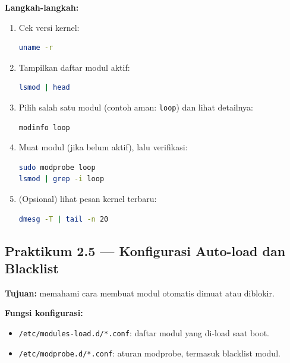 \textbf{Langkah-langkah:}
\begin{enumerate}
    \item Cek versi kernel:
\begin{lstlisting}[language=bash, caption={Cek versi kernel}]
uname -r
\end{lstlisting}

    \item Tampilkan daftar modul aktif:
\begin{lstlisting}[language=bash, caption={Daftar modul aktif}]
lsmod | head
\end{lstlisting}

    \item Pilih salah satu modul (contoh aman: \texttt{loop}) dan lihat detailnya:
\begin{lstlisting}[language=bash, caption={Detail modul dengan modinfo}]
modinfo loop
\end{lstlisting}

    \item Muat modul (jika belum aktif), lalu verifikasi:
\begin{lstlisting}[language=bash, caption={Load modul dan verifikasi}]
sudo modprobe loop
lsmod | grep -i loop
\end{lstlisting}

    \item (Opsional) lihat pesan kernel terbaru:
\begin{lstlisting}[language=bash, caption={Cek log kernel terbaru}]
dmesg -T | tail -n 20
\end{lstlisting}
\end{enumerate}

\subsection*{Praktikum 2.5 --- Konfigurasi Auto-load dan Blacklist}
\textbf{Tujuan:} memahami cara membuat modul otomatis dimuat atau diblokir.

\textbf{Fungsi konfigurasi:}
\begin{itemize}
    \item \texttt{/etc/modules-load.d/*.conf}: daftar modul yang di-load saat boot.
    \item \texttt{/etc/modprobe.d/*.conf}: aturan modprobe, termasuk blacklist modul.
\end{itemize}

